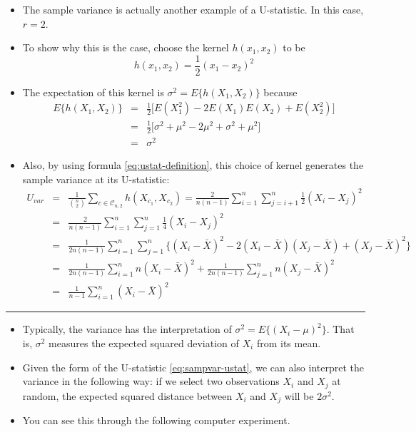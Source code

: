 \documentclass[]{book}
\begin{document}
\begin{itemize}
\item
  The sample variance is actually another example of a U-statistic.
  In this case, \(r = 2\).
\item
  To show why this is the case, choose the kernel \(h(x_{1}, x_{2})\) to be
  \begin{equation}
  h(x_{1}, x_{2}) = \frac{1}{2}(x_{1} - x_{2})^{2} \nonumber
  \end{equation}
\item
  The expectation of this kernel is \(\sigma^{2} = E\{ h(X_{1}, X_{2}) \}\) because
  \begin{eqnarray}
  E\{ h(X_{1}, X_{2}) \} &=& \frac{1}{2}\Big[ E(X_{1}^{2}) - 2E(X_{1})E(X_{2})  + E(X_{2}^{2}) \Big] \nonumber \\
  &=& \frac{1}{2}\Big[ \sigma^{2} + \mu^{2} - 2\mu^{2}  + \sigma^{2} + \mu^{2} \Big] \nonumber \\
  &=& \sigma^{2}
  \label{eq:sampvar-ustat}
  \end{eqnarray}
\item
  Also, by using formula \eqref{eq:ustat-definition}, this choice of kernel generates the sample variance at its U-statistic:
  \begin{eqnarray}
  U_{var} &=& \frac{1}{{n \choose 2}} \sum_{c \in \mathcal{C}_{n,2}} h(X_{c_{1}}, X_{c_{2}})
  = \frac{2}{n(n-1)}\sum_{i=1}^{n} \sum_{j=i+1}^{n} \frac{1}{2} (X_{i} - X_{j})^{2}  \nonumber \\
  &=& \frac{2}{n(n-1)}\sum_{i=1}^{n} \sum_{j=1}^{n} \frac{1}{4}(X_{i} - X_{j})^{2} \nonumber \\
  &=& \frac{1}{2n(n-1)}\sum_{i=1}^{n} \sum_{j=1}^{n} \{ (X_{i} - \bar{X})^{2} - 2(X_{i} - \bar{X})(X_{j} - \bar{X}) + (X_{j} - \bar{X})^{2} \} \nonumber \\
  &=& \frac{1}{2n(n-1)}\sum_{i=1}^{n} n(X_{i} - \bar{X})^{2} + \frac{1}{2n(n-1)}\sum_{j=1}^{n} n(X_{j} - \bar{X})^{2}  \nonumber \\
  &=& \frac{1}{n-1}\sum_{i=1}^{n} (X_{i} - \bar{X})^{2} \nonumber
  \end{eqnarray}
\end{itemize}

\begin{center}\rule{0.5\linewidth}{\linethickness}\end{center}

\begin{itemize}
\item
  Typically, the variance has the interpretation of \(\sigma^{2} = E\{ (X_{i} - \mu)^{2} \}\).
  That is, \(\sigma^{2}\) measures the expected squared deviation of \(X_{i}\) from its mean.
\item
  Given the form of the U-statistic \eqref{eq:sampvar-ustat}, we can also interpret the variance
  in the following way: if we select two observations \(X_{i}\) and \(X_{j}\) at random,
  the expected squared distance between \(X_{i}\) and \(X_{j}\) will be \(2\sigma^{2}\).
\item
  You can see this through the following computer experiment.
\end{itemize}
\end{document}
